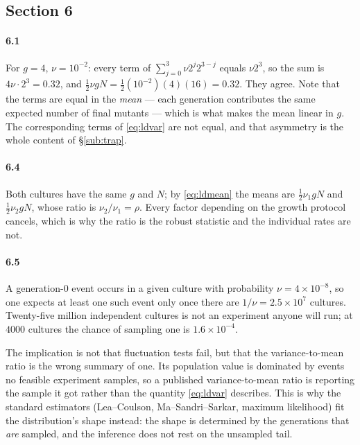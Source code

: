 \subsection*{Section 6}

\paragraph{6.1}
For $g = 4$, $\nu = 10^{-2}$: every term of
$\sum_{j=0}^{3} \nu 2^{j} 2^{3-j}$ equals $\nu 2^{3}$, so the sum is
$4\nu\cdot 2^{3} = 0.32$, and $\tfrac{1}{2}\nu g N =
\tfrac{1}{2}(10^{-2})(4)(16) = 0.32$. They agree. Note that the terms are equal
in the \emph{mean} --- each generation contributes the same expected number of
final mutants --- which is what makes the mean linear in $g$. The corresponding
terms of \eqref{eq:ldvar} are not equal, and that asymmetry is the whole content
of §\ref{sub:trap}.

\paragraph{6.4}
Both cultures have the same $g$ and $N$; by \eqref{eq:ldmean} the means are
$\tfrac12\nu_1 gN$ and $\tfrac12\nu_2 gN$, whose ratio is $\nu_2/\nu_1 = \rho$.
Every factor depending on the growth protocol cancels, which is why the ratio is
the robust statistic and the individual rates are not.

\paragraph{6.5}
A generation-$0$ event occurs in a given culture with probability $\nu =
4\times10^{-8}$, so one expects at least one such event only once there are
$1/\nu = 2.5\times10^{7}$ cultures. Twenty-five million independent cultures is
not an experiment anyone will run; at $4000$ cultures the chance of sampling one
is $1.6\times10^{-4}$.

The implication is not that fluctuation tests fail, but that the
variance-to-mean ratio is the wrong summary of one. Its population value is
dominated by events no feasible experiment samples, so a published
variance-to-mean ratio is reporting the sample it got rather than the quantity
\eqref{eq:ldvar} describes. This is why the standard estimators
(Lea--Coulson, Ma--Sandri--Sarkar, maximum likelihood) fit the distribution's
shape instead: the shape is determined by the generations that \emph{are}
sampled, and the inference does not rest on the unsampled tail.

